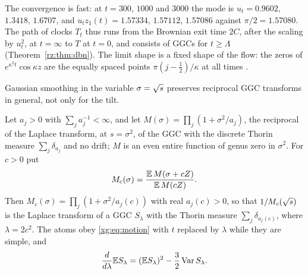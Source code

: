 The convergence is fast: at $t=300$, $1000$ and $3000$ the mode is $u_t=0.9602$, $1.3418$, $1.6707$, and $u_tz_1(t)=1.57334$, $1.57112$, $1.57086$ against $\pi/2=1.57080$. The path of clocks $T_t$ thus runs from the Brownian exit time $2C$, after the scaling by $u_t^2$, at $t=\infty$ to $T$ at $t=0$, and consists of GGCs for $t\ge\Lambda$ (Theorem~\ref{rz:thm:dbn}). The limit shape is a fixed shape of the flow: the zeros of $e^{\kappa^2t}\cos\kappa z$ are the equally spaced points $\pi(j-\frac12)/\kappa$ at all times \cite{Newton26}.

Gaussian smoothing in the variable $\sigma=\sqrt{s}$ preserves reciprocal GGC transforms in general, not only for the tilt.

\begin{theorem}\label{xg:thm:smooth}
Let $a_j>0$ with $\sum_ja_j^{-1}<\infty$, and let $M(\sigma)=\prod_j(1+\sigma^2/a_j)$, the reciprocal of the Laplace transform, at $s=\sigma^2$, of the GGC with the discrete Thorin measure $\sum_j\delta_{a_j}$ and no drift; $M$ is an even entire function of genus zero in $\sigma^2$. For $c>0$ put
\[
M_c(\sigma)=\frac{\mathbb{E}\,M(\sigma+cZ)}{\mathbb{E}\,M(cZ)}.
\]
Then $M_c(\sigma)=\prod_j(1+\sigma^2/a_j(c))$ with real $a_j(c)>0$, so that $1/M_c(\sqrt{s})$ is the Laplace transform of a GGC $S_\lambda$ with the Thorin measure $\sum_j\delta_{a_j(c)}$, where $\lambda=2c^2$. The atoms obey \eqref{xg:eq:motion} with $t$ replaced by $\lambda$ while they are simple, and
\[
\frac{d}{d\lambda}\mathbb{E} S_\lambda=(\mathbb{E} S_\lambda)^2-\frac32\operatorname{Var}S_\lambda.
\]
\end{theorem}

